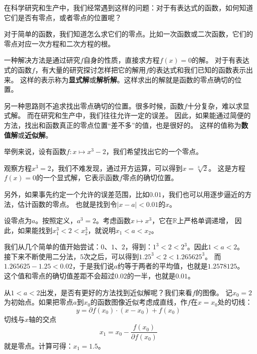 \documentclass[12pt,UTF8,fontset=none]{ctexbook}
\begin{document}
在科学研究和生产中，我们经常遇到这样的问题：对于有表达式的函数，如何知道它们是否有零点，或者零点的位置呢？

对于简单的函数，我们知道怎么求它们的零点。比如一次函数或二次函数，它们的零点对应一次方程和二次方程的根。

一种解决方法是通过研究$f$自身的性质，直接求方程$f(x) = 0$的解。
对于有表达式的函数$f$，有大量的研究探讨怎样把它的解用$f$的表达式和我们已知的函数表示出来。
这样的表示称为\textbf{显式解}或\textbf{解析解}。这样求出的解就是函数的零点确切的位置。

另一种思路则不追求找出零点确切的位置。很多时候，函数$f$十分复杂，难以求显式解。
而在研究和生产中，我们往往允许一定的误差。
因此，如果能通过简便的方法，找出和函数真正的零点位置“差不多”的值，也是很好的。
这样的值称为\textbf{数值解}或\textbf{近似解}。

举例来说，设有函数$f: x\mapsto x^3 - 2$，我们希望找出它的一个零点。

观察方程$x^3 = 2$，我们不难发现，通过开方运算，可以得到$x = \sqrt[3]{2}$。
这是方程$f(x) = 0$的一个显式解，它表示函数$f$零点的确切位置。

另外，如果事先约定一个允许的误差范围，比如$0.01$，我们也可以用逐步逼近的方法，估计函数的零点。
也就是找到令$|x - a| < 0.01$的$x$。

设零点为$a$。按照定义，$a^3 = 2$。考虑函数$x\mapsto x^3$，它在$\mathbb{R}$上严格单调递增，
因此，如果能找到$x_1^3 < 2 < x_2^3$，就说明$x_1 < a < x_2$。

我们从几个简单的值开始尝试：$0$、$1$、$2$，得到：$1^3 < 2 < 2^3$。因此$1 < a < 2$。
接下来不断使用二分法，$5$次之后，可以得到$1.25^3 < 2 < 1.265625^3$。
而$1.265625 - 1.25 < 0.02$，于是我们说$a$约等于两者的平均值，也就是$1.2578125$。
这个值和零点的确切值差距不会超过$0.02$的一半，也就是$0.01$。

从$1 < a < 2$出发，是否有更好的方法找到近似解呢？我们来看$f$的图像。
记$x_0 = 2$为初始点。如果把零点$a$到$x_0$的函数图像近似考虑成直线，作$f$在$x=x_0$处的切线：
$$ y = \partial f(x_0)\cdot (x - x_0) + f(x_0) $$
切线与$x$轴的交点
$$ x_1 = x_0 - \frac{f(x_0)}{\partial f(x_0)} $$
就是零点。计算可得：$x_1 = 1.5$。
\end{document}
